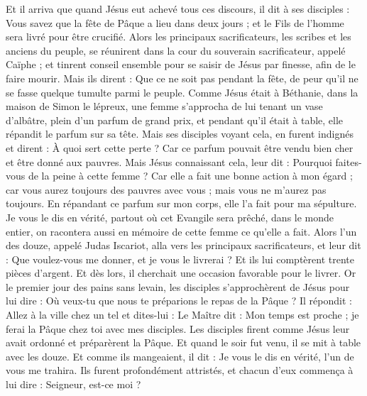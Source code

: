 \begin{multicols}{2}
\VerseOne{}Et il arriva que quand Jésus eut achevé tous ces discours, il dit à ses disciples :
Vous savez que la fête de Pâque a lieu dans deux jours ; et le Fils de l'homme sera livré pour être crucifié.
Alors les principaux sacrificateurs, les scribes et les anciens du peuple, se réunirent dans la cour du souverain sacrificateur, appelé Caïphe ;
et tinrent conseil ensemble pour se saisir de Jésus par finesse, afin de le faire mourir.
Mais ils dirent : Que ce ne soit pas pendant la fête, de peur qu'il ne se fasse quelque tumulte parmi le peuple.
Comme Jésus était à Béthanie, dans la maison de Simon le lépreux,
une femme s'approcha de lui tenant un vase d'albâtre, plein d'un parfum de grand prix, et pendant qu'il était à table, elle répandit le parfum sur sa tête.
Mais ses disciples voyant cela, en furent indignés et dirent : À quoi sert cette perte ?
Car ce parfum pouvait être vendu bien cher et être donné aux pauvres.
Mais Jésus connaissant cela, leur dit : Pourquoi faites-vous de la peine à cette femme ? Car elle a fait une bonne action à mon égard ;
car vous aurez toujours des pauvres avec vous ; mais vous ne m'aurez pas toujours.
En répandant ce parfum sur mon corps, elle l'a fait pour ma sépulture.
Je vous le dis en vérité, partout où cet Evangile sera prêché, dans le monde entier, on racontera aussi en mémoire de cette femme ce qu'elle a fait.
Alors l'un des douze, appelé Judas Iscariot, alla vers les principaux sacrificateurs,
et leur dit : Que voulez-vous me donner, et je vous le livrerai ? Et ils lui comptèrent trente pièces d'argent.
Et dès lors, il cherchait une occasion favorable pour le livrer.
Or le premier jour des pains sans levain, les disciples s'approchèrent de Jésus pour lui dire : Où veux-tu que nous te préparions le repas de la Pâque ?
Il répondit : Allez à la ville chez un tel et dites-lui : Le Maître dit : Mon temps est proche ; je ferai la Pâque chez toi avec mes disciples.
Les disciples firent comme Jésus leur avait ordonné et préparèrent la Pâque.
Et quand le soir fut venu, il se mit à table avec les douze.
Et comme ils mangeaient, il dit : Je vous le dis en vérité, l'un de vous me trahira.
Ils furent profondément attristés, et chacun d'eux commença à lui dire : Seigneur, est-ce moi ?

\end{multicols}
